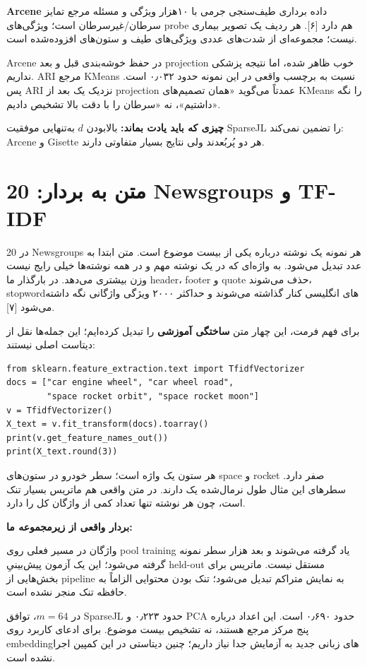 \documentclass[11pt,a4paper]{article}
\newcommand{\lesson}[1]{\clearpage\section{#1}}
\newcommand{\codefile}[1]{\begin{latin}\end{latin}}
\newcommand{\takeaway}[1]{\par\textbf{چیزی که باید یادت بماند:} #1\par}
\begin{document}
\textbf{Arcene} داده برداری طیف‌سنجی جرمی با ۱۰هزار ویژگی و مسئله مرجع تمایز سرطان/غیرسرطان است؛ ویژگی‌های probe هم دارد [۶]. هر ردیف یک تصویر بیماری نیست؛ مجموعه‌ای از شدت‌های عددی ویژگی‌های طیف و ستون‌های افزوده‌شده است.
\codefile{arcene_sample.txt}
Arcene در حفظ خوشه‌بندی قبل و بعد projection خوب ظاهر شده، اما نتیجه پزشکی نداریم. ARI مرجع KMeans نسبت به برچسب واقعی در این نمونه حدود ۰٫۰۳۲ است. پس ARI نزدیک یک بعد از projection عمدتاً می‌گوید «همان تصمیم‌های KMeans را نگه داشتیم»، نه «سرطان را با دقت بالا تشخیص دادیم».

\takeaway{بالابودن \(d\) به‌تنهایی موفقیت SparseJL را تضمین نمی‌کند: Arcene و Gisette هر دو پُربُعدند ولی نتایج بسیار متفاوتی دارند.}

\lesson{متن به بردار: 20 Newsgroups و TF-IDF}
در 20 Newsgroups هر نمونه یک نوشته درباره یکی از بیست موضوع است. متن ابتدا به عدد تبدیل می‌شود.  به واژه‌ای که در یک نوشته مهم و در همه نوشته‌ها خیلی رایج نیست وزن بیشتری می‌دهد. در بارگذار ما header، footer و quote حذف می‌شوند، stopwordهای انگلیسی کنار گذاشته می‌شوند و حداکثر ۲۰۰۰ ویژگی واژگانی نگه داشته می‌شود [۷].

برای فهم فرمت، این چهار متن \textbf{ساختگی آموزشی} را تبدیل کرده‌ایم؛ این جمله‌ها نقل از دیتاست اصلی نیستند:
\begin{latin}\begin{lstlisting}
from sklearn.feature_extraction.text import TfidfVectorizer
docs = ["car engine wheel", "car wheel road",
        "space rocket orbit", "space rocket moon"]
v = TfidfVectorizer()
X_text = v.fit_transform(docs).toarray()
print(v.get_feature_names_out())
print(X_text.round(3))
\end{lstlisting}\end{latin}
\codefile{tfidf_output.txt}
هر ستون یک واژه است؛ سطر خودرو در ستون‌های space و rocket صفر دارد. سطرهای این مثال طول نرمال‌شده یک دارند. در متن واقعی هم ماتریس بسیار تنک است، چون هر نوشته تنها تعداد کمی از واژگان کل را دارد.

\textbf{بردار واقعی از زیرمجموعه ما:}
\codefile{20ng_tfidf_sample.txt}
واژگان در مسیر فعلی روی pool training یاد گرفته می‌شوند و بعد هزار سطر نمونه گرفته می‌شود؛ این یک آزمون پیش‌بینیِ held-out مستقل نیست. ماتریس برای بخش‌هایی از pipeline به نمایش متراکم تبدیل می‌شود؛ تنک بودن محتوایی الزاماً به حافظه تنک منجر نشده است.

در \(m=64\)، توافق SparseJL حدود ۰٫۲۲۳ و PCA حدود ۰٫۶۹۰ است. این اعداد درباره پنج مرکز مرجع هستند، نه تشخیص بیست موضوع. برای ادعای کاربرد روی embeddingهای زبانی جدید به آزمایش جدا نیاز داریم؛ چنین دیتاستی در این کمپین اجرا نشده است.
\end{document}
